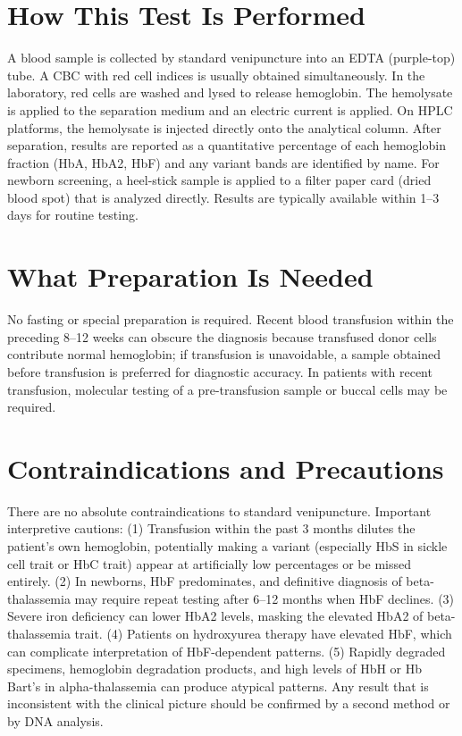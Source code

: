 \section*{How This Test Is Performed}
A blood sample is collected by standard venipuncture into an EDTA (purple-top) tube. A CBC with red cell indices is usually obtained simultaneously. In the laboratory, red cells are washed and lysed to release hemoglobin. The hemolysate is applied to the separation medium and an electric current is applied. On HPLC platforms, the hemolysate is injected directly onto the analytical column. After separation, results are reported as a quantitative percentage of each hemoglobin fraction (HbA, HbA2, HbF) and any variant bands are identified by name. For newborn screening, a heel-stick sample is applied to a filter paper card (dried blood spot) that is analyzed directly. Results are typically available within 1--3 days for routine testing.

\section*{What Preparation Is Needed}
No fasting or special preparation is required. Recent blood transfusion within the preceding 8--12 weeks can obscure the diagnosis because transfused donor cells contribute normal hemoglobin; if transfusion is unavoidable, a sample obtained before transfusion is preferred for diagnostic accuracy. In patients with recent transfusion, molecular testing of a pre-transfusion sample or buccal cells may be required.

\section*{Contraindications and Precautions}
There are no absolute contraindications to standard venipuncture. Important interpretive cautions: (1) Transfusion within the past 3 months dilutes the patient's own hemoglobin, potentially making a variant (especially HbS in sickle cell trait or HbC trait) appear at artificially low percentages or be missed entirely. (2) In newborns, HbF predominates, and definitive diagnosis of beta-thalassemia may require repeat testing after 6--12 months when HbF declines. (3) Severe iron deficiency can lower HbA2 levels, masking the elevated HbA2 of beta-thalassemia trait. (4) Patients on hydroxyurea therapy have elevated HbF, which can complicate interpretation of HbF-dependent patterns. (5) Rapidly degraded specimens, hemoglobin degradation products, and high levels of HbH or Hb Bart's in alpha-thalassemia can produce atypical patterns. Any result that is inconsistent with the clinical picture should be confirmed by a second method or by DNA analysis.

